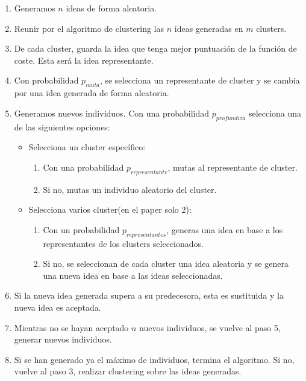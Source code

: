 \begin{enumerate}
	\item Generamos $n$ ideas de forma aleatoria.

	\item Reunir por el algoritmo de clustering las $n$ ideas generadas en $m$ clusters.

	\item De cada cluster, guarda la idea que tenga mejor puntuación de la función de coste. Esta será la idea representante.

	\item Con probabilidad $p_{muta}$, se selecciona un representante de cluster y se cambia por una idea generada de forma aleatoria.

	\item Generamos nuevos individuos. Con una probabilidad $p_{profundiza}$ selecciona una de las siguientes opciones:

	\begin{itemize}
		\item Selecciona un cluster específico:\\
		\begin{enumerate}
			\item Con una probabilidad $p_{representante}$, mutas al representante de cluster.
			\item Si no, mutas un individuo aleatorio del cluster.
		\end{enumerate}

		\item Selecciona varios cluster(en el paper solo 2):\\
		\begin{enumerate}
			\item Con un probabilidad $p_{representantes}$, generas una idea en base a los representantes de los clusters seleccionados.
			\item Si no, se seleccionan de cada cluster una idea aleatoria y se genera una nueva idea en base a las ideas seleccionadas.
		\end{enumerate}
	\end{itemize}

	\item Si la nueva idea generada supera a su predecesora, esta es sustituida y la nueva idea es aceptada.

	\item Mientras no se hayan aceptado $n$ nuevos individuos, se vuelve al paso 5, generar nuevos individuos.

	\item Si se han generado ya el máximo de individuos, termina el algoritmo. Si no, vuelve al paso 3, realizar clustering sobre las ideas generadas.
\end{enumerate}


